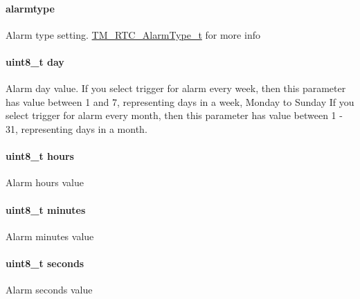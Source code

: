 \paragraph[{alarmtype}]{ alarmtype}\label{struct_t_m___r_t_c___alarm_time__t_a47319bdd7ad0d444587eaf62803a0335}
Alarm type setting. \hyperlink{group___t_m___r_t_c___typedefs_gaf7ce20d46cd105428f15c7f45b3b0882}{T\+M\+\_\+\+R\+T\+C\+\_\+\+Alarm\+Type\+\_\+t} for more info \hypertarget{struct_t_m___r_t_c___alarm_time__t_a72369a1087b2aeffe374bb054cb97c12}{}
\paragraph[{day}]{\setlength{\rightskip}{0pt plus 5cm}uint8\+\_\+t day}\label{struct_t_m___r_t_c___alarm_time__t_a72369a1087b2aeffe374bb054cb97c12}
Alarm day value. If you select trigger for alarm every week, then this parameter has value between 1 and 7, representing days in a week, Monday to Sunday If you select trigger for alarm every month, then this parameter has value between 1 -\/ 31, representing days in a month. \hypertarget{struct_t_m___r_t_c___alarm_time__t_a00a531a34a1d603329df5778f1203ab6}{}
\paragraph[{hours}]{\setlength{\rightskip}{0pt plus 5cm}uint8\+\_\+t hours}\label{struct_t_m___r_t_c___alarm_time__t_a00a531a34a1d603329df5778f1203ab6}
Alarm hours value \hypertarget{struct_t_m___r_t_c___alarm_time__t_a7acca8be0094a19be6e308ac05924c4f}{}
\paragraph[{minutes}]{\setlength{\rightskip}{0pt plus 5cm}uint8\+\_\+t minutes}\label{struct_t_m___r_t_c___alarm_time__t_a7acca8be0094a19be6e308ac05924c4f}
Alarm minutes value \hypertarget{struct_t_m___r_t_c___alarm_time__t_a46729a903be1a03cdb248fb48d84d4f5}{}
\paragraph[{seconds}]{\setlength{\rightskip}{0pt plus 5cm}uint8\+\_\+t seconds}\label{struct_t_m___r_t_c___alarm_time__t_a46729a903be1a03cdb248fb48d84d4f5}
Alarm seconds value 